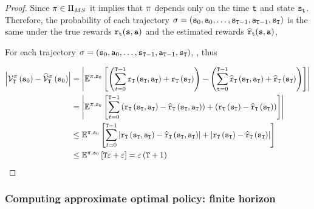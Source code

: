 \begin{proof}
Since $\pi\in  {\Pi _{MS}}$ it implies that $\pi$ depends
only on the time ${\tt t}$ and state ${\tt s}_{\tt t}$.
%
Therefore, the probability of each trajectory
$\sigma=({\tt s}_0,{\tt a}_0,\ldots,
{\tt s}_{{\tt T}-1},{\tt a}_{{\tt T}-1},{\tt s}_{\tt T})$ is the
same under the true rewards ${\tt r}_{\tt t}({\tt s},{\tt a})$ and the
estimated rewards $\widehat{{\tt r}}_{\tt t}({\tt s},{\tt a})$,

For each trajectory $\sigma=({\tt s}_0,{\tt a}_0,\ldots,
{\tt s}_{{\tt T}-1},{\tt a}_{{\tt T}-1},{\tt s}_{\tt T})$, , thus 

\begin{align*}
	\left|\mathcal{V}_{\tt T}^{\pi}\left({\tt s}_{0}\right)-\widehat{\mathcal{V}}_{\tt T}^{\pi}\left({\tt s}_{0}\right)\right| & =\left|\mathbb{E}^{\pi,{\tt s}_{0}}\left[\left(\sum_{t=0}^{{\tt T}-1}{\tt r}_{\tt T}\left({\tt s}_{\tt T},{\tt a}_{\tt T}\right)+{\tt r}_{\tt T}\left({\tt s}_{{\tt T}}\right)\right)-\left(\sum_{{\tt t}=0}^{{\tt T}-1}\widehat{{\tt r}}_{\tt T}\left({\tt s}_{\tt T},{\tt a}_{\tt T}\right)+\widehat{{\tt r}}_{\tt T}\left({\tt s}_{\tt T}\right)\right)\right]\right|\\
	& =\left|\mathbb{E}^{\pi,{\tt s}_{0}}\left[\sum_{t=0}^{{\tt T}-1}\left({\tt r}_{\tt T}\left({\tt s}_{\tt T},{\tt a}_{\tt T}\right)-\widehat{{\tt r}}_{\tt T}\left({\tt s}_{\tt T},{\tt a}_{\tt T}\right)\right)+\left({\tt r}_{\tt T}\left({\tt s}_{\tt T}\right)-\widehat{{\tt r}}_{\tt T}\left({\tt s}_{\tt T}\right)\right)\right]\right|\\
	& \leq\mathbb{E}^{\pi,{\tt s}_{0}}\left[\sum_{t=0}^{{\tt T}-1}\left|{\tt r}_{\tt T}\left({\tt s}_{\tt T},{\tt a}_{\tt T}\right)-\widehat{{\tt r}}_{\tt T}\left({\tt s}_{\tt T},{\tt a}_{\tt T}\right)\right|+\left|{\tt r}_{\tt T}\left({\tt s}_{\tt T}\right)-\widehat{{\tt r}}_{\tt T}\left({\tt s}_{\tt T}\right)\right|\right]\\
	& \leq\mathbb{E}^{\pi,{\tt s}_{0}}\left[{\tt T}\varepsilon+\varepsilon\right]=\varepsilon\left({\tt T}+1\right)
\end{align*}
\end{proof}

\subsubsection{Computing approximate optimal policy: finite horizon}


